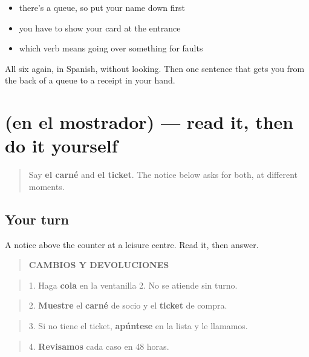 \begin{itemize}
\raggedright
  \item there's a queue, so put your name down first
  \item you have to show your card at the entrance
  \item which verb means going over something for faults
\end{itemize}

\begin{tcolorbox}[breakable,colback=teal!4,colframe=teal!35!black,title={Before you move on}]
All six again, in Spanish, without looking. Then one sentence that gets you from the back of a queue to a receipt in your hand.
\end{tcolorbox}
\section[Practice]{(en el mostrador) — read it, then do it yourself}

\label{lesson:ES-C451-sintesis-turno}



\begin{quote}
Say \textbf{el carné} and \textbf{el ticket}. The notice below asks for both, at different moments.
\end{quote}

\subsection*{Your turn}
A notice above the counter at a leisure centre. Read it, then answer.

\begin{quote}
\textbf{CAMBIOS Y DEVOLUCIONES}
\end{quote}

\begin{quote}
1. Haga \textbf{cola} en la ventanilla 2. No se atiende sin turno.
\end{quote}

\begin{quote}
2. \textbf{Muestre} el \textbf{carné} de socio y el \textbf{ticket} de compra.
\end{quote}

\begin{quote}
3. Si no tiene el ticket, \textbf{apúntese} en la lista y le llamamos.
\end{quote}

\begin{quote}
4. \textbf{Revisamos} cada caso en 48 horas.
\end{quote}

